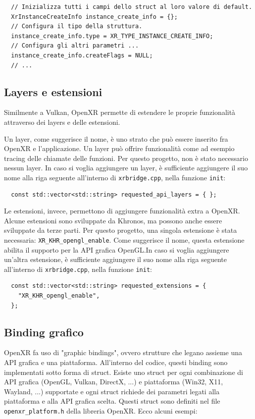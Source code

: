 \documentclass[twoside]{supsistudent}
\begin{document}
\begin{verbatim}
  // Inizializza tutti i campi dello struct al loro valore di default.
  XrInstanceCreateInfo instance_create_info = {};
  // Configura il tipo della struttura.
  instance_create_info.type = XR_TYPE_INSTANCE_CREATE_INFO;
  // Configura gli altri parametri ...
  instance_create_info.createFlags = NULL;
  // ...
\end{verbatim}

\subsection{Layers e estensioni}

Similmente a Vulkan, OpenXR permette di estendere le proprie funzionalità attraverso dei layers e delle estensioni.

Un layer, come suggerisce il nome, è uno strato che può essere inserito fra OpenXR e l'applicazione. Un layer può offrire funzionalità come ad esempio tracing delle chiamate delle funzioni. Per questo progetto, non è stato necessario nessun layer. In caso si voglia aggiungere un layer, è sufficiente aggiungere il suo nome alla riga seguente all'interno di \texttt{xrbridge.cpp}, nella funzione \texttt{init}:

\begin{verbatim}
  const std::vector<std::string> requested_api_layers = { };
\end{verbatim}

Le estensioni, invece, permettono di aggiungere funzionalità extra a OpenXR. Alcune estensioni sono sviluppate da Khronos, ma possono anche essere sviluppate da terze parti. Per questo progetto, una singola estensione è stata necessaria: \texttt{XR\_KHR\_opengl\_enable}. Come suggerisce il nome, questa estensione abilita il supporto per la API grafica OpenGL.In caso si voglia aggiungere un'altra estensione, è sufficiente aggiungere il suo nome alla riga seguente all'interno di \texttt{xrbridge.cpp}, nella funzione \texttt{init}:

\begin{verbatim}
  const std::vector<std::string> requested_extensions = {
    "XR_KHR_opengl_enable",
  };
\end{verbatim}

\subsection{Binding grafico}

OpenXR fa uso di "graphic bindings", ovvero strutture che legano assieme una API grafica e una piattaforma. All'interno del codice, questi binding sono implementati sotto forma di struct. Esiste uno struct per ogni combinazione di API grafica (OpenGL, Vulkan, DirectX, ...) e piattaforma (Win32, X11, Wayland, ...) supportate e ogni struct richiede dei parametri legati alla piattaforma e alla API grafica scelta. Questi struct sono definiti nel file \texttt{openxr\_platform.h} della libreria OpenXR. Ecco alcuni esempi:
\end{document}

